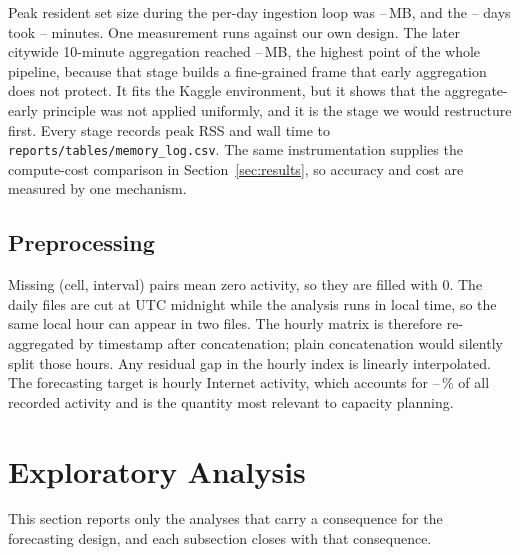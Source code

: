 \documentclass[conference,onecolumn,11pt]{IEEEtran}
\providecommand{\internetShare}{--}
\providecommand{\ingestPeakMB}{--}
\providecommand{\ingestTotalMin}{--}
\providecommand{\ingestDays}{--}
\providecommand{\pipelinePeakMB}{--}
\begin{document}
Peak resident set size during the per-day ingestion loop was \ingestPeakMB{}\,MB, and the \ingestDays{} days took \ingestTotalMin{} minutes. One measurement runs against our own design. The later citywide 10-minute aggregation reached \pipelinePeakMB{}\,MB, the highest point of the whole pipeline, because that stage builds a fine-grained frame that early aggregation does not protect. It fits the Kaggle environment, but it shows that the aggregate-early principle was not applied uniformly, and it is the stage we would restructure first. Every stage records peak RSS and wall time to \texttt{reports/tables/memory\_log.csv}. The same instrumentation supplies the compute-cost comparison in Section~\ref{sec:results}, so accuracy and cost are measured by one mechanism.

\begin{table}[t]
\centering\caption{Memory footprint of the ingestion strategy (RSS = resident set size). The first two rows are estimates for a naive load; the rest are measured.}\label{tab:memory}
\footnotesize
{}
\end{table}

\subsection{Preprocessing}
Missing (cell, interval) pairs mean zero activity, so they are filled with 0. The daily files are cut at UTC midnight while the analysis runs in local time, so the same local hour can appear in two files. The hourly matrix is therefore re-aggregated by timestamp after concatenation; plain concatenation would silently split those hours. Any residual gap in the hourly index is linearly interpolated. The forecasting target is hourly Internet activity, which accounts for \internetShare{}\,\% of all recorded activity and is the quantity most relevant to capacity planning.

\section{Exploratory Analysis}
This section reports only the analyses that carry a consequence for the forecasting design, and each subsection closes with that consequence.
\end{document}
